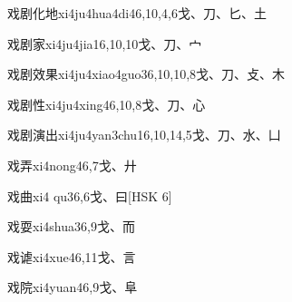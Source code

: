 \begin{EntryWithPhonetic}{戏剧化地}{xi4ju4hua4di4}{6,10,4,6}{⼽、⼑、⼔、⼟}
\end{EntryWithPhonetic}

\begin{EntryWithPhonetic}{戏剧家}{xi4ju4jia1}{6,10,10}{⼽、⼑、⼧}
\end{EntryWithPhonetic}

\begin{EntryWithPhonetic}{戏剧效果}{xi4ju4xiao4guo3}{6,10,10,8}{⼽、⼑、⽁、⽊}
\end{EntryWithPhonetic}

\begin{EntryWithPhonetic}{戏剧性}{xi4ju4xing4}{6,10,8}{⼽、⼑、⼼}
\end{EntryWithPhonetic}

\begin{EntryWithPhonetic}{戏剧演出}{xi4ju4yan3chu1}{6,10,14,5}{⼽、⼑、⽔、⼐}
\end{EntryWithPhonetic}

\begin{EntryWithPhonetic}{戏弄}{xi4nong4}{6,7}{⼽、⼶}
\end{EntryWithPhonetic}

\begin{EntryWithPhonetic}{戏曲}{xi4 qu3}{6,6}{⼽、⽈}[HSK 6]
\end{EntryWithPhonetic}

\begin{EntryWithPhonetic}{戏耍}{xi4shua3}{6,9}{⼽、⽽}
\end{EntryWithPhonetic}

\begin{EntryWithPhonetic}{戏谑}{xi4xue4}{6,11}{⼽、⾔}
\end{EntryWithPhonetic}

\begin{EntryWithPhonetic}{戏院}{xi4yuan4}{6,9}{⼽、⾩}
\end{EntryWithPhonetic}

